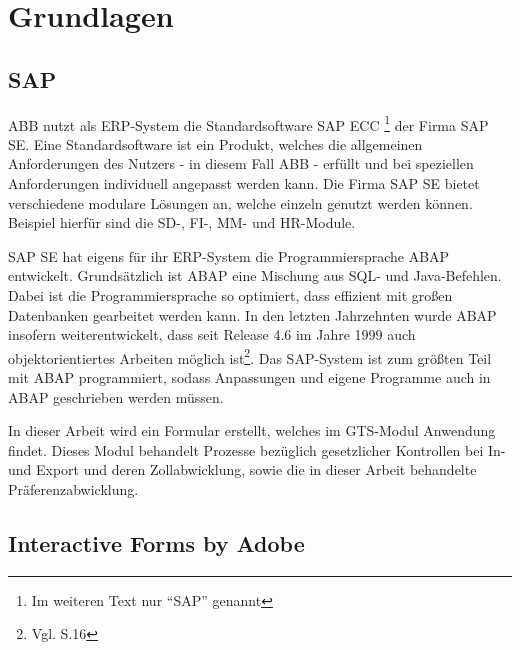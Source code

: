 
\chapter{Grundlagen}
\label{ch:Grundlagen}



\section{SAP}

ABB nutzt als \ac{ERP}-System die Standardsoftware SAP ECC \footnote{Im weiteren Text nur "`SAP"' genannt} der Firma SAP SE. Eine Standardsoftware ist ein Produkt, welches die allgemeinen Anforderungen des Nutzers - in diesem Fall \ac{ABB} - erfüllt und bei speziellen Anforderungen individuell angepasst werden kann. Die Firma SAP SE bietet verschiedene modulare Lösungen an, welche einzeln genutzt werden können. Beispiel hierfür sind die \ac{SD}-, \ac{FI}-, \ac{MM}- und \ac{HR}-Module. 

SAP SE hat eigens für ihr \ac{ERP}-System die Programmiersprache \ac{ABAP} entwickelt. Grundsätzlich ist \ac{ABAP} eine Mischung aus \ac{SQL}- und Java-Befehlen. Dabei ist  die Programmiersprache so optimiert, dass effizient mit großen Datenbanken gearbeitet werden kann. In den letzten Jahrzehnten wurde \ac{ABAP} insofern weiterentwickelt, dass  seit Release 4.6 im Jahre 1999 auch objektorientiertes Arbeiten möglich ist\footnote{Vgl. \cite{Keller.2001} S.16}. Das SAP-System  ist zum größten Teil mit \ac{ABAP} programmiert, sodass Anpassungen und eigene Programme auch in \ac{ABAP} geschrieben werden müssen. 

In dieser Arbeit wird ein Formular erstellt, welches im \ac{GTS}-Modul Anwendung findet. Dieses Modul behandelt Prozesse bezüglich gesetzlicher Kontrollen bei In- und Export und deren Zollabwicklung, sowie die in dieser Arbeit behandelte Präferenzabwicklung.




\section{Interactive Forms by Adobe}

